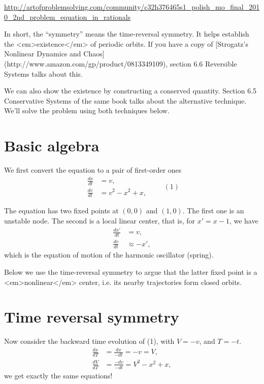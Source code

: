 \documentclass{article}
\begin{document}
\url{http://artofproblemsolving.com/community/c32h376465s1_polish_mo_final_2010_2nd_problem_equation_in_rationals}


In short, the ``symmetry'' means the time-reversal symmetry.  It helps establish the <em>existence</em> of periodic orbits.  If you have a copy of [Strogatz's Nonlinear Dynamics and Chaos](http://www.amazon.com/gp/product/0813349109), section 6.6 Reversible Systems talks about this.

We can also show the existence by constructing a conserved quantity.  Section 6.5 Conservative Systems of the same book talks about the alternative technique.  We'll solve the problem using both techniques below.

\section{ Basic algebra }

We first convert the equation to a pair of first-order ones
$$
\begin{aligned}
\frac{dx}{dt} &= v, \\
\frac{dv}{dt} &= v^2 - x^2 + x,
\end{aligned}
\quad \quad (1)
$$

The equation has two fixed points at $(0, 0)$ and $(1, 0)$.  The first one is an unstable node.  The second is a local linear center, that is, for $x' = x - 1$, we have
$$
\begin{aligned}
\frac{dx'}{dt} &= v, \\
\frac{dv}{dt} &\approx -x',
\end{aligned}
$$
which is the equation of motion of the harmonic oscillator (spring).

Below we use the time-reversal symmetry to argue that the latter fixed point is a <em>nonlinear</em> center, i.e. its nearby trajectories form closed orbits.


\section{ Time reversal symmetry }

Now consider the backward time evolution of (1), with $V = -v$, and $T = -t$.
$$
\begin{aligned}
\frac{dx}{dT} &= \frac{dx}{-dt} = -v = V, \\
\frac{dV}{dT} &= \frac{-dv}{-dt} = V^2 - x^2 + x,
\end{aligned}
$$
we get exactly the same equations!
\end{document}
